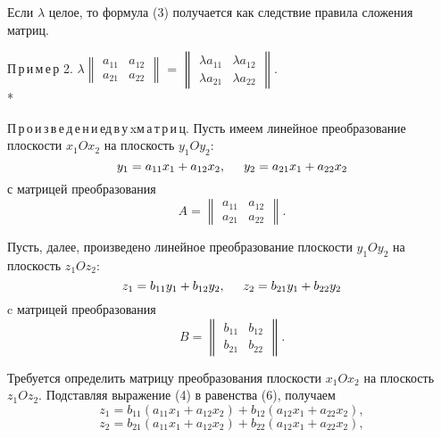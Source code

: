 \documentclass[a4paper, 14pt]{article}
\begin{document}
Если $\lambda$ целое, то формула (3) получается как следствие правила сложения матриц.

П\,р\,и\,м\,е\,р 2. $\lambda\begin{Vmatrix}
a_{11} & a_{12} \\
a_{21} & a_{22}
\end{Vmatrix}$ = 
$\begin{Vmatrix}
\lambda a_{11} & \lambda a_{12} \\
\lambda a_{21} & \lambda a_{22}
\end{Vmatrix}$.\\*

П\,р\,о\,и\,з\,в\,е\,д\,е\,н\,и\,е\hspace{5mm}д\,в\,у\,x\hspace{5mm}м\,а\,т\,р\,и\,ц. Пусть имеем линейное преобразование плоскости $x_1Ox_2$ на плоскость $y_1Oy_2$:
\begin{equation}
    y_1 = a_{11}x_1 + a_{12}x_2,\hspace{5mm}y_2 = a_{21}x_1 + a_{22}x_2
\end{equation}
с матрицей преобразования
\begin{equation}
    A = \begin{Vmatrix}
a_{11} & a_{12} \\
a_{21} & a_{22}
\end{Vmatrix}.
\end{equation}

Пусть, далее, произведено линейное преобразование плоскости $y_1Oy_2$ на плоскость $z_1Oz_2$:
\begin{equation}
    z_1 = b_{11}y_1 + b_{12}y_2,\hspace{5mm}z_2 = b_{21}y_1 + b_{22}y_2
\end{equation}
c матрицей преобразования
\begin{equation}
    B = \begin{Vmatrix}
b_{11} & b_{12} \\
b_{21} & b_{22}
\end{Vmatrix}.
\end{equation}

Требуется определить матрицу преобразования плоскости $x_1Ox_2$ на плоскость $z_1Oz_2$. Подставляя выражение (4) в равенства (6), получаем
$$z_1 = b_{11}(a_{11}x_1 + a_{12}x_2) + b_{12}(a_{12}x_1 + a_{22}x_2),$$
$$z_2 = b_{21}(a_{11}x_1 + a_{12}x_2) + b_{22}(a_{12}x_1 + a_{22}x_2),$$
\end{document}
